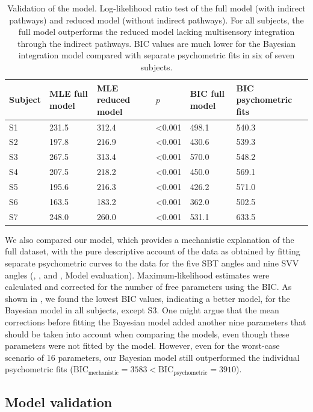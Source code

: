 \begin{table}
\begin{tabular}{llllll}
\hline
Subject & MLE full model & MLE reduced model & $p$ & BIC full model & BIC psychometric fits \\
\hline
S1 & 231.5 & 312.4 & \textless 0.001 & 498.1 & 540.3 \\
S2 & 197.8 & 216.9 & \textless 0.001 & 430.6 & 539.3 \\
S3 & 267.5 & 313.4 & \textless 0.001 & 570.0 & 548.2 \\
S4 & 207.5 & 218.2 & \textless 0.001 & 450.0 & 569.1 \\
S5 & 195.6 & 216.3 & \textless 0.001 & 426.2 & 571.0 \\
S6 & 163.5 & 183.2 & \textless 0.001 & 362.0 & 502.5 \\
S7 & 248.0 & 260.0 & \textless 0.001 & 531.1 & 633.5 \\
\end{tabular}
\caption{Validation of the model. Log-likelihood ratio test of the full model (with indirect pathways) and reduced model (without indirect pathways). For all subjects, the full model outperforms the reduced model lacking multisensory integration through the indirect pathways. BIC values are much lower for the Bayesian integration model compared with separate psychometric fits in six of seven subjects.}
\label{p1:tab2}
\end{table}

We also compared our model, which provides a mechanistic explanation of the full dataset, with the pure descriptive account of the data as obtained by fitting separate psychometric curves to the data for the five SBT angles and nine SVV angles (, , and , Model evaluation). Maximum-likelihood estimates were calculated and corrected for the number of free parameters using the BIC. As shown in , we found the lowest BIC values, indicating a better model, for the Bayesian model in all subjects, except S3. One might argue that the mean corrections before fitting the Bayesian model added another nine parameters that should be taken into account when comparing the models, even though these parameters were not fitted by the model. However, even for the worst-case scenario of 16 parameters, our Bayesian model still outperformed the individual psychometric fits ($\text{BIC}_\text{mechanistic} = 3583 < \text{BIC}_\text{psychometric} = \text{3910}$).

\subsection{Model validation}

